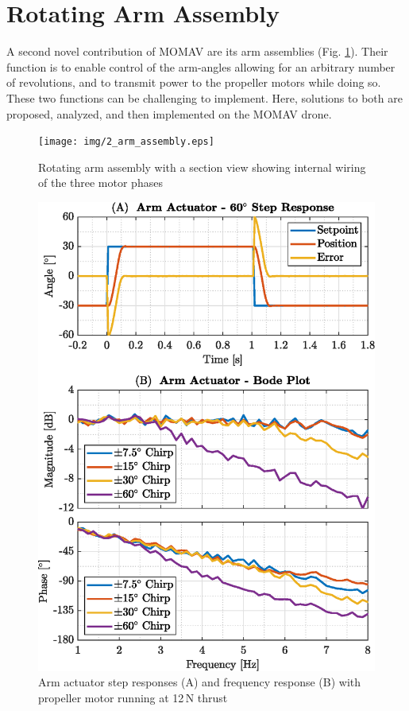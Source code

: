 \documentclass[conference]{IEEEtran}
\newcommand{\txtapprox}{\raisebox{0.5ex}{\texttildelow}}
\begin{document}
\section{Rotating Arm Assembly}
A second novel contribution of MOMAV are its arm assemblies (Fig. \ref{fig:2_arm_assembly}). Their function is to enable control of the arm-angles allowing for an arbitrary number of revolutions, and to transmit power to the propeller motors while doing so. These two functions can be challenging to implement. Here, solutions to both are proposed, analyzed, and then implemented on the MOMAV drone.
\begin{figure}[t!]
	\texttt{[image: img/2\_arm\_assembly.eps]}
	\centering
	\vspace{-14pt}
	\caption{Rotating arm assembly with a section view showing internal wiring of the three motor phases}
	\label{fig:2_arm_assembly}
	\vspace{-2pt}
\end{figure}
\begin{figure}[t!]
	\includegraphics[width=\columnwidth]{img/2_servo_dynamics.eps}
	\centering
	\caption{Arm actuator step responses (A) and frequency response (B) with propeller motor running at \txtapprox12\,N thrust}
	\label{fig:2_servo_dynamics}
	\vspace{-4pt}
\end{figure}
\end{document}
